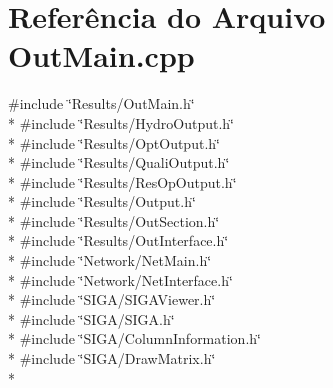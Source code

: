 \section{Referência do Arquivo Out\+Main.\+cpp}
\label{_out_main_8cpp}
{\ttfamily \#include \char`\"{}Results/\+Out\+Main.\+h\char`\"{}}\\*
{\ttfamily \#include \char`\"{}Results/\+Hydro\+Output.\+h\char`\"{}}\\*
{\ttfamily \#include \char`\"{}Results/\+Opt\+Output.\+h\char`\"{}}\\*
{\ttfamily \#include \char`\"{}Results/\+Quali\+Output.\+h\char`\"{}}\\*
{\ttfamily \#include \char`\"{}Results/\+Res\+Op\+Output.\+h\char`\"{}}\\*
{\ttfamily \#include \char`\"{}Results/\+Output.\+h\char`\"{}}\\*
{\ttfamily \#include \char`\"{}Results/\+Out\+Section.\+h\char`\"{}}\\*
{\ttfamily \#include \char`\"{}Results/\+Out\+Interface.\+h\char`\"{}}\\*
{\ttfamily \#include \char`\"{}Network/\+Net\+Main.\+h\char`\"{}}\\*
{\ttfamily \#include \char`\"{}Network/\+Net\+Interface.\+h\char`\"{}}\\*
{\ttfamily \#include \char`\"{}S\+I\+G\+A/\+S\+I\+G\+A\+Viewer.\+h\char`\"{}}\\*
{\ttfamily \#include \char`\"{}S\+I\+G\+A/\+S\+I\+G\+A.\+h\char`\"{}}\\*
{\ttfamily \#include \char`\"{}S\+I\+G\+A/\+Column\+Information.\+h\char`\"{}}\\*
{\ttfamily \#include \char`\"{}S\+I\+G\+A/\+Draw\+Matrix.\+h\char`\"{}}\\*
